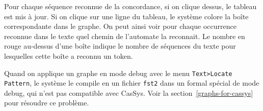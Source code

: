 \bigskip
\noindent Pour chaque séquence reconnue de la concordance, si on clique dessus, le tableau est
mis à jour. Si on clique sur une ligne du tableau, le système colore la boîte correspondante dans le graphe.
On peut ainsi voir pour chaque occurrence reconnue dans le texte quel chemin de l'automate la
reconnait. Le nombre en rouge au-dessus d'une boîte indique le nombre de  séquences du texte
pour lesquelles cette boîte a reconnu un token.

\bigskip
\noindent Quand on applique un graphe en mode debug avec le menu \verb+Text>Locate Pattern+,
le système le compile en un fichier \verb+fst2+ dans un formal spécial de mode debug, qui n'est
pas compatible avec CasSys. Voir la section~\ref{graphs-for-cassys} pour résoudre ce problème.
